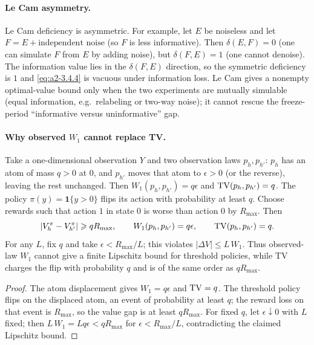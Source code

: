 \paragraph{Le Cam asymmetry.}
Le Cam deficiency is asymmetric.  For example, let $E$ be noiseless and let
$F=E+\text{independent noise}$ (so $F$ is less informative).  Then
$\delta(E,F)=0$ (one can simulate $F$ from $E$ by adding noise), but
$\delta(F,E)=1$ (one cannot denoise).  The information value lies in the
$\delta(F,E)$ direction, so the symmetric deficiency is $1$ and
\eqref{eq:a2-3.4.4} is vacuous under information loss.  Le Cam gives a nonempty
optimal-value bound only when the two experiments are mutually simulable
(equal information, e.g.\ relabeling or two-way noise); it cannot rescue the
freeze-period ``informative versus uninformative'' gap.

\paragraph{Why observed $W_1$ cannot replace TV.}
\begin{aIIPropWone}
Take a one-dimensional observation $Y$ and two observation laws $p_h,p_{h'}$:
$p_h$ has an atom of mass $q>0$ at $0$, and $p_{h'}$ moves that atom to
$\epsilon>0$ (or the reverse), leaving the rest unchanged.  Then
$W_1(p_h,p_{h'})=q\epsilon$ and $\mathrm{TV}(p_h,p_{h'})=q$.  The policy
$\pi(y)=\mathbf{1}\{y>0\}$ flips its action with probability at least $q$.
Choose rewards such that action $1$ in state $0$ is worse than action $0$ by
$R_{\max}$.  Then
\[
|V_h^\pi-V_{h'}^\pi|\geqslant qR_{\max},
\qquad
W_1(p_h,p_{h'})=q\epsilon,
\qquad
\mathrm{TV}(p_h,p_{h'})=q.
\]
For any $L$, fix $q$ and take $\epsilon<R_{\max}/L$; this violates
$|\Delta V|\le L\,W_1$.  Thus observed-law $W_1$ cannot give a finite Lipschitz
bound for threshold policies, while TV charges the flip with probability $q$
and is of the same order as $qR_{\max}$.
\end{aIIPropWone}

\begin{proof}
The atom displacement gives $W_1=q\epsilon$ and $\mathrm{TV}=q$.  The threshold policy
flips on the displaced atom, an event of probability at least $q$; the reward
loss on that event is $R_{\max}$, so the value gap is at least $qR_{\max}$.  For
fixed $q$, let $\epsilon\downarrow0$ with $L$ fixed; then
$L\,W_1=Lq\epsilon<qR_{\max}$ for $\epsilon<R_{\max}/L$, contradicting the
claimed Lipschitz bound.
\end{proof}

